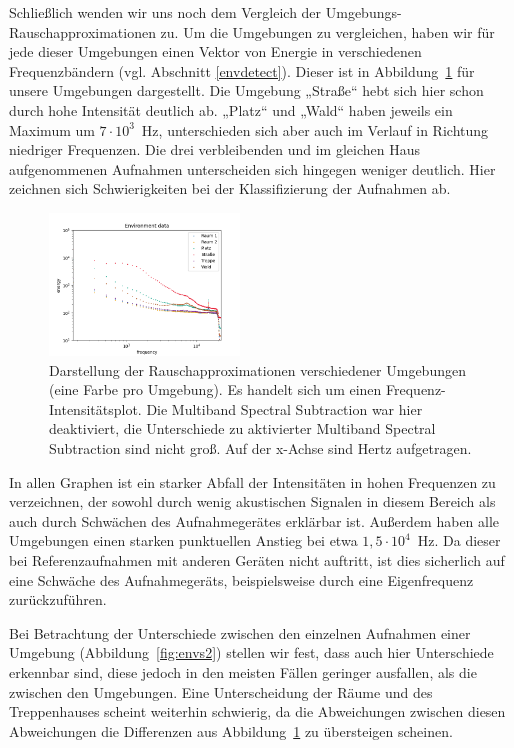 \documentclass[
	fontsize=10.5pt,
	marginpar=false,
	ngerman,
	accentcolor=3d
	]{tudapub}
\begin{document}
Schließlich wenden wir uns noch dem Vergleich der Umgebungs-Rauschapproximationen zu. Um die Umgebungen zu vergleichen, haben wir für jede dieser Umgebungen einen Vektor von Energie in verschiedenen Frequenzbändern (vgl. Abschnitt \ref{envdetect}). Dieser ist in Abbildung~\ref{fig:envs} für unsere Umgebungen dargestellt. Die Umgebung „Straße“ hebt sich hier schon durch hohe Intensität deutlich ab. „Platz“ und „Wald“ haben jeweils ein Maximum um $7\cdot10^3$~Hz, unterschieden sich aber auch im Verlauf in Richtung niedriger Frequenzen. Die drei verbleibenden und im gleichen Haus aufgenommenen Aufnahmen unterscheiden sich hingegen weniger deutlich. Hier zeichnen sich Schwierigkeiten bei der Klassifizierung der Aufnahmen ab.

\begin{figure}[h]
	\centering
	\includegraphics[width=0.45\textwidth]{media/envs}
	\caption{Darstellung der Rauschapproximationen verschiedener Umgebungen (eine Farbe pro Umgebung). Es handelt sich um einen Frequenz-Intensitätsplot. Die Multiband Spectral Subtraction war hier deaktiviert, die Unterschiede zu aktivierter Multiband Spectral Subtraction sind nicht groß. Auf der x-Achse sind Hertz aufgetragen.}
	\label{fig:envs}
\end{figure}

In allen Graphen ist ein starker Abfall der Intensitäten in hohen Frequenzen zu verzeichnen, der sowohl durch wenig akustischen Signalen in diesem Bereich als auch durch Schwächen des Aufnahmegerätes erklärbar ist. Außerdem haben alle Umgebungen einen starken punktuellen Anstieg bei etwa $1,5\cdot10^4$~Hz. Da dieser bei Referenzaufnahmen mit anderen Geräten nicht auftritt, ist dies sicherlich auf eine Schwäche des Aufnahmegeräts, beispielsweise durch eine Eigenfrequenz zurückzuführen.

Bei Betrachtung der Unterschiede zwischen den einzelnen Aufnahmen einer Umgebung (Abbildung~\ref{fig:envs2}) stellen wir fest, dass auch hier Unterschiede erkennbar sind, diese jedoch in den meisten Fällen geringer ausfallen, als die zwischen den Umgebungen. Eine Unterscheidung der Räume und des Treppenhauses scheint weiterhin schwierig, da die Abweichungen zwischen diesen Abweichungen die Differenzen aus Abbildung~\ref{fig:envs} zu übersteigen scheinen.
\end{document}
